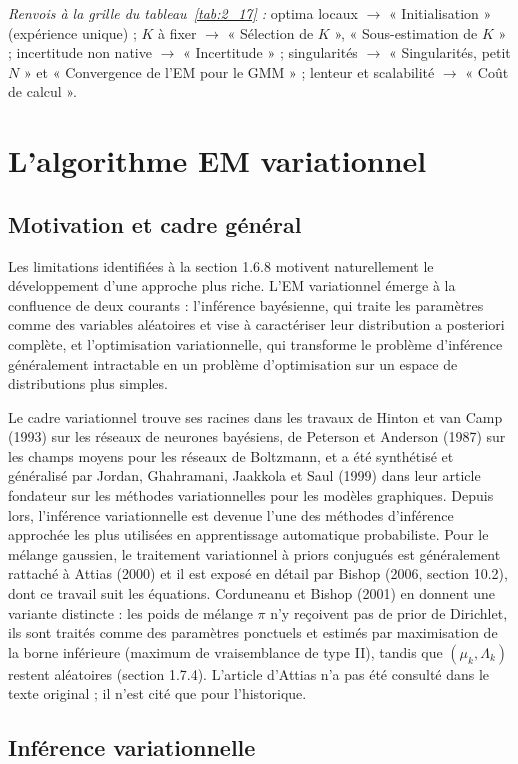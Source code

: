 \par\noindent\emph{Renvois à la grille du tableau~\ref{tab:2_17} :} optima locaux $\to$ « Initialisation » (expérience unique) ; $K$ à fixer $\to$ « Sélection de $K$ », « Sous-estimation de $K$ » ; incertitude non native $\to$ « Incertitude » ; singularités $\to$ « Singularités, petit $N$ » et « Convergence de l'EM pour le GMM » ; lenteur et scalabilité $\to$ « Coût de calcul ».
\section{L'algorithme EM variationnel}
\subsection{Motivation et cadre général}
Les limitations identifiées à la section 1.6.8 motivent naturellement le développement d'une approche plus riche. L'EM variationnel émerge à la confluence de deux courants : l'inférence bayésienne, qui traite les paramètres comme des variables aléatoires et vise à caractériser leur distribution a posteriori complète, et l'optimisation variationnelle, qui transforme le problème d'inférence  généralement intractable  en un problème d'optimisation sur un espace de distributions plus simples.

Le cadre variationnel trouve ses racines dans les travaux de Hinton et van Camp (1993) sur les réseaux de neurones bayésiens, de Peterson et Anderson (1987) sur les champs moyens pour les réseaux de Boltzmann, et a été synthétisé et généralisé par Jordan, Ghahramani, Jaakkola et Saul (1999) dans leur article fondateur sur les méthodes variationnelles pour les modèles graphiques. Depuis lors, l'inférence variationnelle est devenue l'une des méthodes d'inférence approchée les plus utilisées en apprentissage automatique probabiliste. Pour le mélange gaussien, le traitement variationnel à priors conjugués est généralement rattaché à Attias (2000) et il est exposé en détail par Bishop (2006, section 10.2), dont ce travail suit les équations. Corduneanu et Bishop (2001) en donnent une variante distincte : les poids de mélange $\pi$ n'y reçoivent pas de prior de Dirichlet, ils sont traités comme des paramètres ponctuels et estimés par maximisation de la borne inférieure (maximum de vraisemblance de type II), tandis que $(\mu_k, \Lambda_k)$ restent aléatoires (section 1.7.4). L'article d'Attias n'a pas été consulté dans le texte original ; il n'est cité que pour l'historique.

\subsection{Inférence variationnelle}

